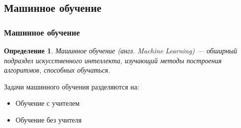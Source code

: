 \documentclass[xcolor=table]{beamer}
\newtheorem{defn}{Определение}
\begin{document}
\subsection{Машинное обучение}
\begin{frame}
  \frametitle{Машинное обучение}
  \begin{defn}
    Машинное обучение (англ. Machine Learning) — обширный подраздел искусственного интеллекта, изучающий методы построения алгоритмов, способных обучаться.
  \end{defn}

  \vspace{25pt}

  Задачи машинного обучения разделяются на:
  \begin{itemize}
  \item Обучение с учителем    \\
  \item Обучение без учителя
  \end{itemize}
\end{frame}


\end{document}

